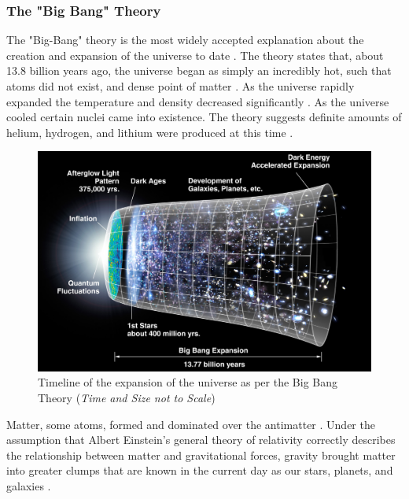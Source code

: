 \documentclass[12pt]{article}
\begin{document}
\subsubsection{The "Big Bang" Theory} \label{sec:1.1.1}

The "Big-Bang" theory is the most widely accepted explanation about the creation and \allowbreak expansion of the universe to date
\cite{britbigbang,spacebigbang}.
The theory states that, about 13.8 billion years ago, the universe began as simply an incredibly hot, such that atoms did not exist, 
and dense point of matter
\cite{britbigbang,spacebigbang,hubblebigbang}.
As the universe rapidly expanded the temperature and density decreased significantly
\cite{britbigbang,hubblebigbang}.
As the universe cooled certain nuclei came into existence. The theory suggests definite amounts of helium, hydrogen, and lithium were produced at this time
\cite{britbigbang}.

\begin{figure}[H]
    \centering
    \includegraphics[width=12.5cm]{bigbang.jpg}
    \caption{\centering \footnotesize{Timeline of the expansion of the universe as per the Big Bang Theory (\textit{Time and Size not to Scale})} \protect\cite{bigbangpic}}
    \label{fig:bigbang}
\end{figure}

Matter, some atoms, formed \cite{hubblebigbang} and dominated over the antimatter \cite{britbigbang}.
Under the assumption that Albert Einstein's general theory of relativity correctly describes the relationship between matter and gravitational forces,
gravity brought matter into greater clumps that are known in the current day as our stars, planets, and galaxies
\cite{hubblebigbang}.
\end{document}
